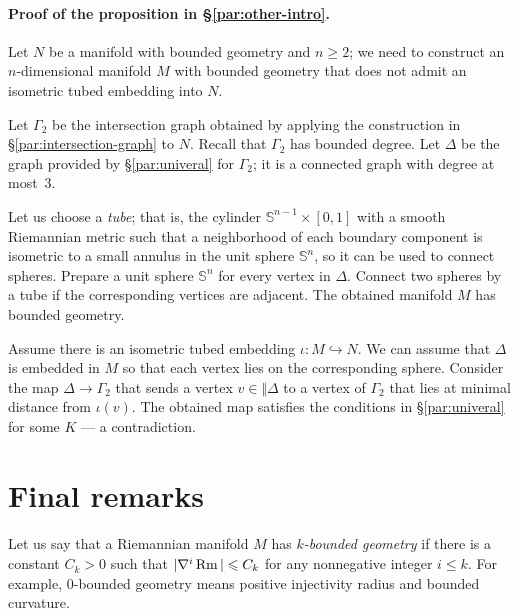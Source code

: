 \documentclass[a4paper,10pt]{article}
\begin{document}
\paragraph{Proof of the proposition in §\ref{par:other-intro}.}\label{par:other-proof}
Let $N$ be a manifold with bounded geometry and $n\ge 2$;
we need to construct an $n$-dimensional manifold $M$ with bounded geometry that does not admit an isometric tubed embedding into $N$.

Let $\Gamma_2$ be the intersection graph obtained by applying the construction in §\ref{par:intersection-graph} to $N$.
Recall that $\Gamma_2$ has bounded degree.
Let $\Delta$ be the graph provided by §\ref{par:univeral} for $\Gamma_2$;
it is a connected graph with  degree at most~3.

Let us choose a \emph{tube}; that is, the cylinder $\mathbb{S}^{n-1}\times [0,1]$ with a smooth Riemannian metric such that a neighborhood of each boundary component is isometric to a small annulus in the unit sphere $\mathbb{S}^n$, so it can be used to connect spheres.
Prepare a unit sphere $\mathbb{S}^n$ for every vertex in $\Delta$.
Connect two spheres by a tube if the corresponding vertices are adjacent.
The obtained manifold $M$ has bounded geometry.

Assume there is an isometric tubed embedding $\iota\colon M\hookrightarrow N$.
We can assume that $\Delta$ is embedded in $M$ so that each vertex lies on the corresponding sphere.
Consider the map $\Delta\to \Gamma_2$ that sends a vertex $v\in \Vert \Delta$ to a vertex of $\Gamma_2$ that lies at minimal distance from $\iota(v)$.
The obtained map satisfies the conditions in §\ref{par:univeral} for some $K$ --- a contradiction.
\qeds





\section*{Final remarks}


\paragraph{}\label{par:remarks}
Let us say that a Riemannian manifold $M$ has \emph{$k$-bounded geometry} if there is a constant $C_k > 0$ such that $|\nabla^i \operatorname{\rm Rm}| \leqslant C_k$ for any nonnegative integer $i\le k$.
For example, $0$-bounded geometry means positive injectivity radius and bounded curvature.
\end{document}
